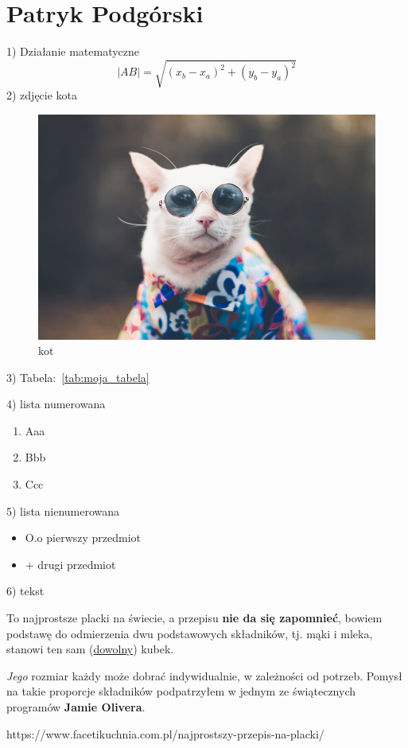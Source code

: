 \section{Patryk Podgórski}

1) Działanie matematyczne 
\begin{equation}
    |AB|=\sqrt{(x_b-x_a)^2+(y_b-y_a)^2}
\end{equation} 
2) zdjęcie kota
\begin{figure}[htbp]
    \centering
    \includegraphics[scale=0.2]{pictures/kot.jpg}
    \caption{kot}
    \label{fig:kot}
\end{figure}

3) Tabela:~\ref{tab:moja_tabela}


4) lista numerowana
\begin{enumerate}
    \item Aaa
    \item Bbb
    \item Ccc
\end{enumerate}

5) lista nienumerowana
\begin{itemize}
    \item {O.o} pierwszy przedmiot
    \item {+} drugi przedmiot
\end{itemize}

6) tekst

To najprostsze placki na świecie, a przepisu \textbf{nie da się zapomnieć}, bowiem podstawę do odmierzenia dwu podstawowych składników, tj. mąki i mleka, stanowi ten sam (\underline{dowolny}) kubek.

\textit{Jego} rozmiar każdy może dobrać indywidualnie, w zależności od potrzeb. Pomysł na takie proporcje składników podpatrzyłem w jednym ze świątecznych programów \textbf{Jamie Olivera}.

https://www.facetikuchnia.com.pl/najprostszy-przepis-na-placki/